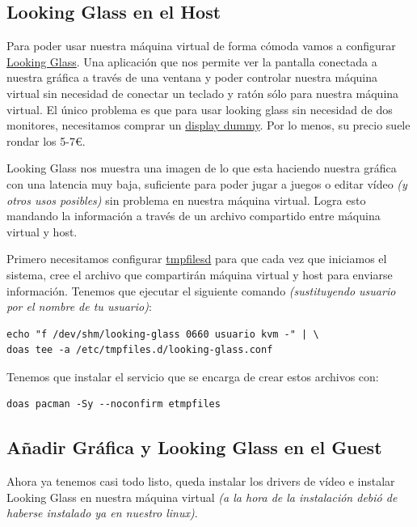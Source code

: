 \documentclass[11pt]{article}
\begin{document}
\subsection{Looking Glass en el Host}

Para poder usar nuestra máquina virtual de forma cómoda vamos a configurar \href{https://looking-glass.io/}{Looking Glass}. Una aplicación que nos permite ver la pantalla conectada a nuestra gráfica a través de una ventana y poder controlar nuestra máquina virtual sin necesidad de conectar un teclado y ratón sólo para nuestra máquina virtual. El único problema es que para usar looking glass sin necesidad de dos monitores, necesitamos comprar un \href{https://www.amazon.com/s?k=display+dummy}{display dummy}. Por lo menos, su precio suele rondar los 5-7€.

\vspace{5pt}

Looking Glass nos muestra una imagen de lo que esta haciendo nuestra gráfica con una latencia muy baja, suficiente para poder jugar a juegos o editar vídeo \textit{(y otros usos posibles)} sin problema en nuestra máquina virtual. Logra esto mandando la información a través de un archivo compartido entre máquina virtual y host.

Primero necesitamos configurar \href{dsada}{tmpfilesd} para que cada vez que iniciamos el sistema, cree el archivo que compartirán máquina virtual y host para enviarse información. Tenemos que ejecutar el siguiente comando \textit{(sustituyendo usuario por el nombre de tu usuario)}:

\begin{verbatim}
echo "f /dev/shm/looking-glass 0660 usuario kvm -" | \
doas tee -a /etc/tmpfiles.d/looking-glass.conf
\end{verbatim}

Tenemos que instalar el servicio que se encarga de crear estos archivos con:

\begin{verbatim}
doas pacman -Sy --noconfirm etmpfiles
\end{verbatim}

\subsection{Añadir Gráfica y Looking Glass en el Guest}

Ahora ya tenemos casi todo listo, queda instalar los drivers de vídeo e instalar Looking Glass en nuestra máquina virtual \textit{(a la hora de la instalación debió de haberse instalado ya en nuestro linux)}.
\end{document}
